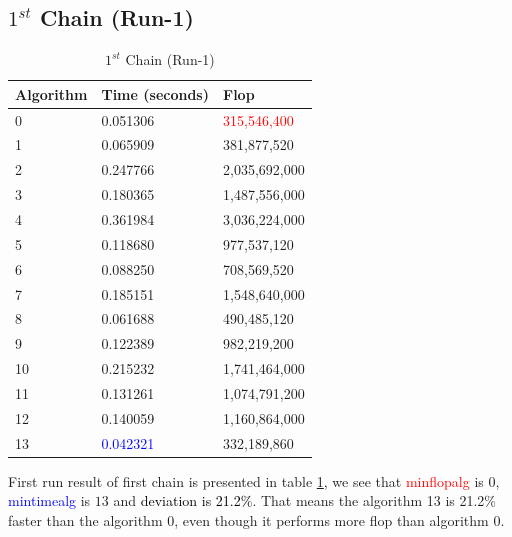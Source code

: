 \documentclass[10pts]{article}
\begin{document}
\subsection*{$1^{st}$ Chain (Run-1)  }

 \begin{table}[htp!]
 	\centering
 	\begin{center}
 		\begin{tabular}{| l | l | l |}
 			\hline
 			\textbf{Algorithm}  & \textbf{Time} (seconds) & \textbf{Flop}\\
 			\hline		
 			0	&   0.051306	&	\textcolor{red}{315,546,400}\\
 			1	&	0.065909 	&	381,877,520\\
 			2 	&	0.247766 	&	2,035,692,000\\
 			3 	&	0.180365 	&	1,487,556,000 \\
 			4 	&	0.361984 	&	3,036,224,000\\
 			5 	&	0.118680 	&	977,537,120\\
 			6	&    0.088250 	&	708,569,520\\
 			7 	&	0.185151 	&	1,548,640,000\\
 			8 	&	0.061688 	&	490,485,120\\
 			9 	&	0.122389 	&	982,219,200\\
 			10 	&	0.215232 	&	1,741,464,000\\
 			11 	&	0.131261 	&	1,074,791,200\\
 			12 	&	0.140059 	&	1,160,864,000\\
 			13 	&	\textcolor{blue}{0.042321} 	&	332,189,860	\\[1ex]
 			\hline
 		\end{tabular}		
 	\end{center}
 	\caption{$1^{st}$ Chain (Run-1)}
 	\label{table:$1^{st}$ Chain (Run-1)}
 \end{table}


 First run result of first chain is presented in table \ref{table:$1^{st}$ Chain (Run-1)}, we see that \textcolor{red}{min\textunderscore flop\textunderscore alg} is $0$,
 \textcolor{blue}{min\textunderscore time\textunderscore alg} is $13$ and  \textcolor{black}{deviation is 21.2\%}. That means the algorithm 13 is 21.2\% faster than the algorithm $0$, even though it performs more flop than algorithm 0.
 
\end{document}

